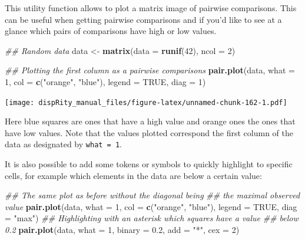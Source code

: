 \documentclass[
]{book}
\newenvironment{Shaded}{\begin{snugshade}}{\end{snugshade}}
\newcommand{\CommentTok}[1]{\textcolor[rgb]{0.56,0.35,0.01}{\textit{#1}}}
\newcommand{\DataTypeTok}[1]{\textcolor[rgb]{0.13,0.29,0.53}{#1}}
\newcommand{\DecValTok}[1]{\textcolor[rgb]{0.00,0.00,0.81}{#1}}
\newcommand{\FloatTok}[1]{\textcolor[rgb]{0.00,0.00,0.81}{#1}}
\newcommand{\KeywordTok}[1]{\textcolor[rgb]{0.13,0.29,0.53}{\textbf{#1}}}
\newcommand{\NormalTok}[1]{#1}
\newcommand{\OtherTok}[1]{\textcolor[rgb]{0.56,0.35,0.01}{#1}}
\newcommand{\StringTok}[1]{\textcolor[rgb]{0.31,0.60,0.02}{#1}}
\begin{document}
This utility function allows to plot a matrix image of pairwise comparisons.
This can be useful when getting pairwise comparisons and if you'd like to see at a glance which pairs of comparisons have high or low values.

\begin{Shaded}
\begin{Highlighting}[]
\CommentTok{\#\# Random data}
\NormalTok{data \textless{}{-}}\StringTok{ }\KeywordTok{matrix}\NormalTok{(}\DataTypeTok{data =} \KeywordTok{runif}\NormalTok{(}\DecValTok{42}\NormalTok{), }\DataTypeTok{ncol =} \DecValTok{2}\NormalTok{)}

\CommentTok{\#\# Plotting the first column as a pairwise comparisons}
\KeywordTok{pair.plot}\NormalTok{(data, }\DataTypeTok{what =} \DecValTok{1}\NormalTok{, }\DataTypeTok{col =} \KeywordTok{c}\NormalTok{(}\StringTok{"orange"}\NormalTok{, }\StringTok{"blue"}\NormalTok{), }\DataTypeTok{legend =} \OtherTok{TRUE}\NormalTok{,}
          \DataTypeTok{diag =} \DecValTok{1}\NormalTok{)}
\end{Highlighting}
\end{Shaded}

\texttt{[image: dispRity\_manual\_files/figure-latex/unnamed-chunk-162-1.pdf]}

Here blue squares are ones that have a high value and orange ones the ones that have low values.
Note that the values plotted correspond the first column of the data as designated by \texttt{what\ =\ 1}.

It is also possible to add some tokens or symbols to quickly highlight to specific cells, for example which elements in the data are below a certain value:

\begin{Shaded}
\begin{Highlighting}[]
\CommentTok{\#\# The same plot as before without the diagonal being}
\CommentTok{\#\# the maximal observed value}
\KeywordTok{pair.plot}\NormalTok{(data, }\DataTypeTok{what =} \DecValTok{1}\NormalTok{, }\DataTypeTok{col =} \KeywordTok{c}\NormalTok{(}\StringTok{"orange"}\NormalTok{, }\StringTok{"blue"}\NormalTok{), }\DataTypeTok{legend =} \OtherTok{TRUE}\NormalTok{,}
          \DataTypeTok{diag =} \StringTok{"max"}\NormalTok{)}
\CommentTok{\#\# Highlighting with an asterisk which squares have a value}
\CommentTok{\#\# below 0.2}
\KeywordTok{pair.plot}\NormalTok{(data, }\DataTypeTok{what =} \DecValTok{1}\NormalTok{, }\DataTypeTok{binary =} \FloatTok{0.2}\NormalTok{, }\DataTypeTok{add =} \StringTok{"*"}\NormalTok{, }\DataTypeTok{cex =} \DecValTok{2}\NormalTok{)}
\end{Highlighting}
\end{Shaded}
\end{document}
